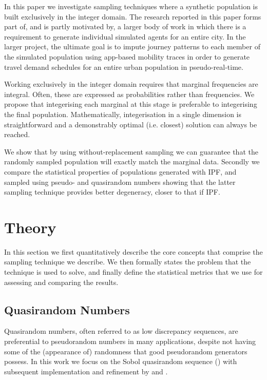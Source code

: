 \documentclass{JASSS}
\begin{document}
In this paper we investigate sampling techniques where a synthetic population is built exclusively in the integer domain. The research reported in this paper forms part of, and is partly motivated by, a larger body of work in which there is a requirement to generate individual simulated agents for an entire city. In the larger project, the ultimate goal is to impute journey patterns to each member of the simulated population using app-based mobility traces in order to generate travel demand schedules for an entire urban population in pseudo-real-time.

Working exclusively in the integer domain requires that marginal frequencies are integral. Often, these are expressed as probabilities rather than frequencies. We propose that integerising each marginal at this stage is preferable to integerising the final population. Mathematically, integerisation in a single dimension is straightforward and a demonstrably optimal (i.e. closest) solution can always be reached.    

We show that by using without-replacement sampling we can guarantee that the randomly sampled population will exactly match the marginal data. Secondly we compare the statistical properties of populations generated with IPF, and sampled using pseudo- and quasirandom numbers  showing that the latter sampling technique provides better degeneracy, closer to that if IPF.

\section{Theory}\label{theory}

In this section we first quantitatively describe the core concepts that comprise the sampling technique we describe. We then formally states the problem that the technique is used to solve, and finally define the statistical metrics that we use for assessing and comparing the results.  

\subsection{Quasirandom Numbers}\label{quasirandom-numbers}
Quasirandom numbers, often referred to as low discrepancy sequences, are
preferential to pseudorandom numbers in many applications, despite not
having some of the (appearance of) randomness that good pseudorandom
generators possess. In this work we focus on the Sobol quasirandom
sequence (\cite{sobol_1967}) with subsequent implementation and refinement by \cite{bratley_algorithm_1988} and \cite{joe_remark_2003}.
\end{document}
